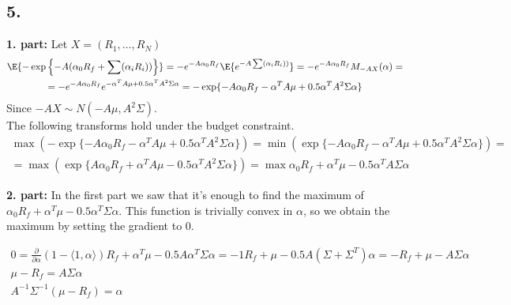 \subsection*{5.}

\textbf{1. part:} Let $X=(R_1,\ldots,R_N)$ 
\begin{gather*}
\E{ - \exp\left\{-A(\alpha_0R_f+\sum(\alpha_i R_i))\right\}} = - e^ {-A\alpha_0R_f} \E{e^{-A\sum(\alpha_i R_i))}} =
- e^ {-A\alpha_0R_f} M_{-AX}(\alpha) = \\
= - e^ {-A\alpha_0R_f} e^{-\alpha^T A \mu +0.5 \alpha^T A^2 \Sigma \alpha} = - \exp \{-A\alpha_0R_f-\alpha^T A \mu +0.5 \alpha^T A^2 \Sigma \alpha\}
\end{gather*}
Since $-AX \sim  N(-A\mu, A^2 \Sigma)$. \\
The following transforms hold under the budget constraint. 
\begin{gather*}
 \max( - \exp \{-A\alpha_0R_f-\alpha^T A \mu +0.5 \alpha^T A^2 \Sigma \alpha\}) = 
 \min (\exp \{-A\alpha_0R_f-\alpha^T A \mu +0.5 \alpha^T A^2 \Sigma \alpha\}) = \\ =
 \max (\exp \{A\alpha_0R_f+\alpha^T A \mu -0.5 \alpha^T A^2 \Sigma \alpha\}) = \max \alpha_0R_f+\alpha^T  \mu -0.5 \alpha^T A \Sigma \alpha\
\end{gather*}

\textbf{2. part:}
In the first part we saw that it's enough to find the maximum of $\alpha_0R_f+\alpha^T\mu-0.5 \alpha^T \Sigma \alpha$. This function is trivially convex in $\alpha$, so we obtain the maximum by setting the gradient to $0$.

\begin{gather*}
    0 = \frac{\partial}{\partial\alpha} (1- \langle 1, \alpha \rangle)R_f +\alpha^T \mu -0.5 A \alpha^T \Sigma \alpha =
    -1 R_f + \mu -0.5 A (\Sigma + \Sigma^T) \alpha =
    - R_f + \mu - A \Sigma \alpha \\
    \mu - R_f = A \Sigma \alpha \\
    A^{-1} \Sigma^{-1} (\mu -R_f) = \alpha 
\end{gather*}

